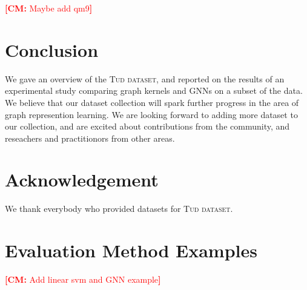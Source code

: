\documentclass{article}
\theoremstyle{definition}
\newcommand{\cm}[1]{{{\textcolor{red}{\textbf{[CM:} {#1}\textbf{]}}}}}
\begin{document}
\begin{table}[t]\centering	
	\cm{Maybe add qm9}	
	\caption{Results for neural and kernel baselines.}
	\label{t2l}	
\end{table}		



\section{Conclusion}

We gave an overview of the \textsc{Tud dataset}, and reported on the results of an experimental study comparing graph kernels and GNNs on a subset of the data. We believe that our dataset collection will spark further progress in the area of graph represention learning. We are looking forward to adding more dataset to our collection, and are excited about contributions from the community, and reseachers and practitionors from other areas.


\section{Acknowledgement}

We thank everybody who provided datasets for \textsc{Tud dataset}.




\appendix

\onecolumn
\section{Evaluation Method Examples}

\cm{Add linear svm and GNN example}
\end{document}
